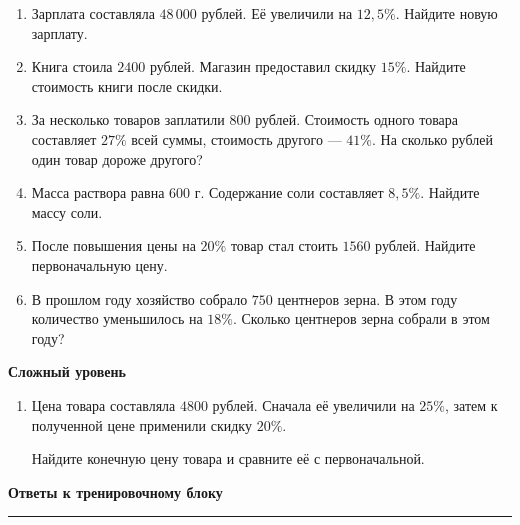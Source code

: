 \documentclass[a4paper,12pt]{article}
\newcommand{\sectiontitle}[1]{%
    \vspace{0.6em}
    {\Large\bfseries\color{darkaccent}#1\par}
    \vspace{0.15em}
    {\color{accent}\rule{\linewidth}{0.6pt}}
    \vspace{0.4em}
}
\newcommand{\subsectiontitle}[1]{%
    \vspace{0.35em}
    {\large\bfseries\color{accent}#1\par}
    \vspace{0.15em}
}
\begin{document}
\begin{enumerate}[resume]

    \item Зарплата составляла \(48\,000\) рублей.
    Её увеличили на \(12{,}5\%\).
    Найдите новую зарплату.

    \item Книга стоила \(2400\) рублей.
    Магазин предоставил скидку \(15\%\).
    Найдите стоимость книги после скидки.

    \item За несколько товаров заплатили \(800\) рублей.
    Стоимость одного товара составляет \(27\%\) всей суммы,
    стоимость другого --- \(41\%\).
    На сколько рублей один товар дороже другого?

    \item Масса раствора равна \(600\) г.
    Содержание соли составляет \(8{,}5\%\).
    Найдите массу соли.

    \item После повышения цены на \(20\%\) товар стал стоить
    \(1560\) рублей.
    Найдите первоначальную цену.

    \item В прошлом году хозяйство собрало \(750\) центнеров зерна.
    В этом году количество уменьшилось на \(18\%\).
    Сколько центнеров зерна собрали в этом году?

\end{enumerate}

\subsectiontitle{Сложный уровень}

\begin{enumerate}[resume]

    \item Цена товара составляла \(4800\) рублей.
    Сначала её увеличили на \(25\%\), затем к полученной цене
    применили скидку \(20\%\).

    Найдите конечную цену товара и сравните её с первоначальной.

\end{enumerate}


\clearpage
\sectiontitle{Ответы к тренировочному блоку}
\end{document}
